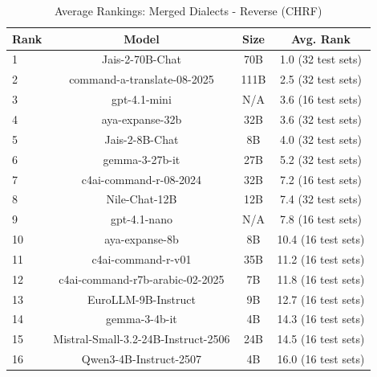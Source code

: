 \begin{table}[htbp]
\centering
\caption{Average Rankings: Merged Dialects - Reverse (CHRF)}
\label{tab:avg_rankings_chrf}
\begin{tabular}{l@{\hspace{3pt}}c@{\hspace{3pt}}c@{\hspace{3pt}}c}
\toprule
Rank & Model & Size & Avg. Rank \\
\midrule
1 & Jais-2-70B-Chat & 70B & 1.0 (32 test sets) \\
2 & command-a-translate-08-2025 & 111B & 2.5 (32 test sets) \\
3 & gpt-4.1-mini & N/A & 3.6 (16 test sets) \\
4 & aya-expanse-32b & 32B & 3.6 (32 test sets) \\
5 & Jais-2-8B-Chat & 8B & 4.0 (32 test sets) \\
6 & gemma-3-27b-it & 27B & 5.2 (32 test sets) \\
7 & c4ai-command-r-08-2024 & 32B & 7.2 (16 test sets) \\
8 & Nile-Chat-12B & 12B & 7.4 (32 test sets) \\
9 & gpt-4.1-nano & N/A & 7.8 (16 test sets) \\
10 & aya-expanse-8b & 8B & 10.4 (16 test sets) \\
11 & c4ai-command-r-v01 & 35B & 11.2 (16 test sets) \\
12 & c4ai-command-r7b-arabic-02-2025 & 7B & 11.8 (16 test sets) \\
13 & EuroLLM-9B-Instruct & 9B & 12.7 (16 test sets) \\
14 & gemma-3-4b-it & 4B & 14.3 (16 test sets) \\
15 & Mistral-Small-3.2-24B-Instruct-2506 & 24B & 14.5 (16 test sets) \\
16 & Qwen3-4B-Instruct-2507 & 4B & 16.0 (16 test sets) \\
\bottomrule
\end{tabular}
\end{table}
